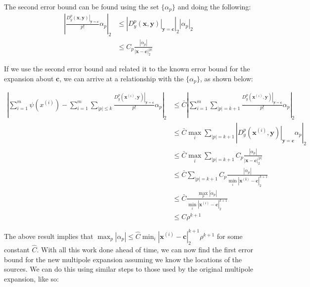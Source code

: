 \documentclass{article}[11pt]
\newcommand{\bvec}[1]{\boldsymbol{#1}}
\begin{document}
   The second error bound can be found using the set $\lbrace \alpha_p \rbrace$ and doing the following:
   \begin{align*}
    \left| \frac{ \left. D_{y}^{p}(\bvec{x},\bvec{y}) \right|_{\bvec{y}=\bvec{c}}}{p!} \alpha_p \right|_2 &\leq \left| \left. D_{y}^{p}(\bvec{x},\bvec{y}) \right|_{\bvec{y}=\bvec{c}} \right|_2 \left| \alpha_p \right|_2\\
    &\leq C_p\frac{\left|\alpha_p\right|}{\left| \bvec{x} - \bvec{c} \right|_2^{|p|} }
   \end{align*}

   If we use the second error bound and related it to the known error bound for the expansion about $\bvec{c}$, we can arrive at a relationship with the $\lbrace \alpha_p \rbrace$, as shown below:

   \begin{align*}
    \left| \sum_{i=1}^m \psi(x^{(i)}) - \sum_{i=1}^m \sum_{|p| \leq k} \frac{ \left. D_{y}^{p}(\bvec{x}^{(i)},\bvec{y}) \right|_{\bvec{y}=\bvec{c}}}{p!} \alpha_p \right|_2 &\leq \bar{C} \left| \sum_{i=1}^m \sum_{|p| = k+1} \frac{ \left. D_{y}^{p}(\bvec{x}^{(i)},\bvec{y}) \right|_{\bvec{y}=\bvec{c}}}{p!} \alpha_p \right|_2 \\
    &\leq \bar{C}  \max_{i} \sum_{|p| = k+1} \left| \left. D_{y}^{p}(\bvec{x}^{(i)},\bvec{y}) \right|_{\bvec{y}=\bvec{c}} \alpha_p \right|_2 \\
    &\leq \bar{C}  \max_{i} \sum_{|p| = k+1} C_p\frac{\left|\alpha_p\right|}{\left| \bvec{x} - \bvec{c} \right|_2^{|p|} } \\
    &\leq \bar{C} \sum_{|p| = k+1} C_p \frac{\left| \alpha_p \right|}{ \min_i \left|\bvec{x^{(i)}} - \bvec{c}\right|_2^{k+1}} \\
    &\leq \bar{C} \frac{ \max_{p} \left| \alpha_p \right|}{\min_i \left|\bvec{x}^{(i)} - \bvec{c}\right|_2^{k+1}} \\
    &\leq C \rho^{k+1}
   \end{align*}

   The above result implies that $\max_p |\alpha_p| \leq \hat{C} \min_i \left|\bvec{x}^{(i)} - \bvec{c}\right|_2^{k+1} \rho^{k+1}$ for some constant $\hat{C}$. With all this work done ahead of time, we can now find the first error bound for the new multipole expansion assuming we know the locations of the sources. We can do this using similar steps to those used by the original multipole expansion, like so:
\end{document}
